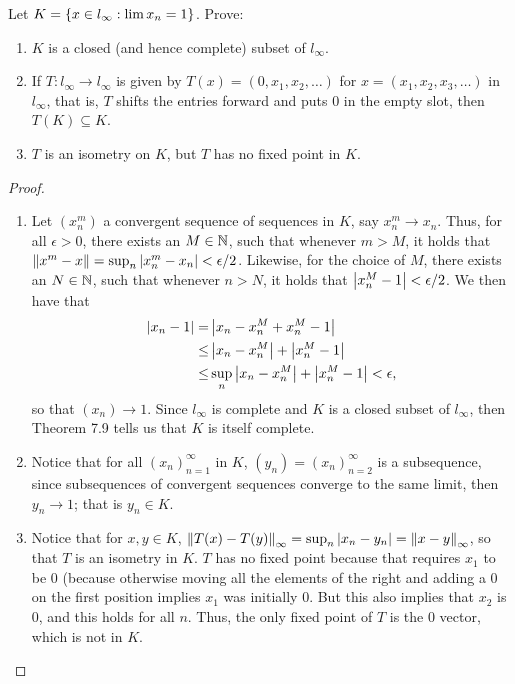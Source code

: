 \begin{exercise}{70}
Let $K=\{x \in l_\infty: \lim x_n = 1\}$.
Prove:
\begin{enumerate}
    \item $K$ is a closed (and hence complete) subset of $l_\infty$.
    \item If $T:l_\infty\to l_\infty$ is given by $T(x) = (0,x_1,x_2,\dots)$ for $x=(x_1,x_2,x_3,\dots)$ in $l_\infty$, that is, $T$ shifts the entries forward and puts 0 in the empty slot, then $T(K)\subseteq K$.
    \item $T$ is an isometry on $K$, but $T$ has no fixed point in $K$.
\end{enumerate}
\end{exercise}
\begin{proof}
\begin{enumerate}
    \item Let $(x_n^m)$ a convergent sequence of sequences in $K$, say $x_n^m \to x_n$.
    Thus, for all $\epsilon>0$, there exists an $M\in\mathbb{N}$, such that whenever $m>M$, it holds that $\left\lVert x^m-x\right\rVert = \sup_n\left\lvert x^m_n-x_n\right\rvert < \epsilon/2$.
    Likewise, for the choice of $M$, there exists an $N\in\mathbb{N}$, such that whenever $n>N$, it holds that $\left\lvert x^M_n-1\right\rvert<\epsilon/2$.
    We then have that 
    \begin{align*}
        \left\lvert x_n-1\right\rvert 
        =& \left\lvert x_n - x_n^M + x_n^M - 1\right\rvert\\
        \leq& \left\lvert x_n - x_n^M\right\rvert + \left\lvert x_n^M - 1\right\rvert\\ 
        \leq& \sup_n\left\lvert x_n - x_n^M\right\rvert + \left\lvert x_n^M - 1\right\rvert < \epsilon,
    \end{align*}
    so that $(x_n)\to 1$.
    Since $l_\infty$ is complete and $K$ is a closed subset of $l_\infty$, then Theorem 7.9 tells us that $K$ is itself complete.
    \item Notice that for all $(x_n)_{n=1}^\infty$ in $K$, $(y_n) = (x_n)_{n=2}^\infty$ is a subsequence, since subsequences of convergent sequences converge to the same limit, then $y_n\to 1$;
    that is $y_n\in K$.
    \item Notice that for $x,y\in K$, $\left\lVert T(x)-T(y)\right\rVert_\infty = \sup_n\left\lvert x_n-y_n\right\rvert = \left\lVert x-y\right\rVert_\infty$, so that $T$ is an isometry in $K$.
    $T$ has no fixed point because that requires $x_1$ to be 0 (because otherwise moving all the elements of the right and adding a 0 on the first position implies $x_1$ was initially 0.
    But this also implies that $x_2$ is 0, and this holds for all $n$.
    Thus, the only fixed point of $T$ is the 0 vector, which is not in $K$.
\end{enumerate}
\end{proof} 
